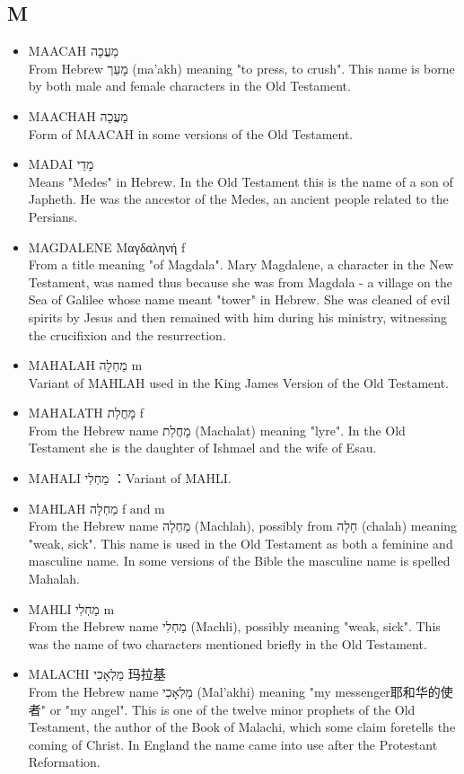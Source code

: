 \subsection{M}
\begin{itemize}
\itemsep-.5em 
\item MAACAH מַעֲכָה\\
From Hebrew מָעַך (ma'akh) meaning "to press, to crush". This name is borne by both male and female characters in the Old Testament.
\item MAACHAH מַעֲכָה \\
Form of MAACAH in some versions of the Old Testament.
\item MADAI מָדַי \\
Means "Medes" in Hebrew. In the Old Testament this is the name of a son of Japheth. He was the ancestor of the Medes, an ancient people related to the Persians.
\item MAGDALENE Μαγδαληνή f \\
From a title meaning "of Magdala". Mary Magdalene, a character in the New Testament, was named thus because she was from Magdala - a village on the Sea of Galilee whose name meant "tower" in Hebrew. She was cleaned of evil spirits by Jesus and then remained with him during his ministry, witnessing the crucifixion and the resurrection. 
\item MAHALAH מַחְלָה m \\
Variant of MAHLAH used in the King James Version of the Old Testament.
\item MAHALATH מָחֲלַת f\\
From the Hebrew name מָחֲלַת (Machalat) meaning "lyre". In the Old Testament she is the daughter of Ishmael and the wife of Esau.
\item MAHALI מַחְלִי ：Variant of MAHLI.
\item MAHLAH מַחְלָה f and m \\
From the Hebrew name מַחְלָה (Machlah), possibly from חָלָה (chalah) meaning "weak, sick". This name is used in the Old Testament as both a feminine and masculine name. In some versions of the Bible the masculine name is spelled Mahalah.
\item MAHLI מַחְלִי m \\
From the Hebrew name מַחְלִי (Machli), possibly meaning "weak, sick". This was the name of two characters mentioned briefly in the Old Testament.
\item MALACHI מַלְאָכִי 玛拉基\\
From the Hebrew name מַלְאָכִי (Mal'akhi) meaning "my messenger耶和华的使者" or "my angel". This is one of the twelve minor prophets of the Old Testament, the author of the Book of Malachi, which some claim foretells the coming of Christ. In England the name came into use after the Protestant Reformation.

\end{itemize}
